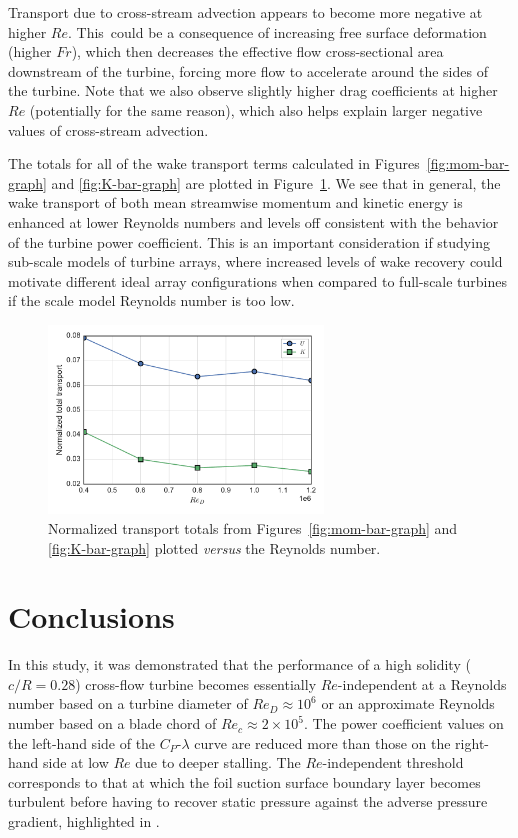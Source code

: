\documentclass[energies,article,accept,moreauthors,pdftex,10pt,a4paper]{mdpi}
\theoremstyle{mdpi}
\newcounter{ex}
\newcounter{re}
\begin{document}
Transport due to cross-stream advection appears to become more negative at
higher $Re$. This~could be a consequence of increasing free surface deformation
(higher $Fr$), which then decreases the effective flow cross-sectional area
downstream of the turbine, forcing more flow to accelerate around the sides of
the turbine. Note that we also observe slightly higher drag coefficients at
higher $Re$ (potentially for the same reason), which also helps explain larger
negative values of cross-stream advection.



The totals for all of the wake transport terms calculated in
Figures~\ref{fig:mom-bar-graph} and \ref{fig:K-bar-graph} are plotted in
Figure~\ref{fig:wake-trans-totals}. We see that in general, the wake transport of
both mean streamwise momentum and kinetic energy is enhanced at lower Reynolds
numbers and levels off consistent with the behavior of the turbine power
coefficient. This is an important consideration if studying sub-scale models of
turbine arrays, where increased levels of wake recovery could motivate different
ideal array configurations when compared to full-scale turbines if the scale
model Reynolds number is too low.

\begin{figure}[H]
\centering
\includegraphics[width=0.65\textwidth]{figures/wake_trans_totals}
\caption{Normalized transport totals from Figures~\ref{fig:mom-bar-graph} and
\ref{fig:K-bar-graph} plotted \textit{versus} the Reynolds number.}
\label{fig:wake-trans-totals}
\end{figure}

\section{Conclusions}

In this study, it was demonstrated that the performance of a high solidity
($c/R=0.28$) cross-flow turbine becomes essentially $Re$-independent at a
Reynolds number based on a turbine diameter of $Re_D \approx 10^6$ or an
approximate Reynolds number based on a blade chord of $Re_c \approx 2 \times
10^5$. The power coefficient values on the left-hand side of the
$C_P$-$\lambda$ curve are reduced more than those on the right-hand side at low
$Re$ due to deeper stalling. The $Re$-independent threshold corresponds to that
at which the foil suction surface boundary layer becomes turbulent before having
to recover static pressure against the adverse pressure gradient, highlighted in
\cite{Lissaman1983, McMasters1980, Carmichael1981}.
\end{document}
